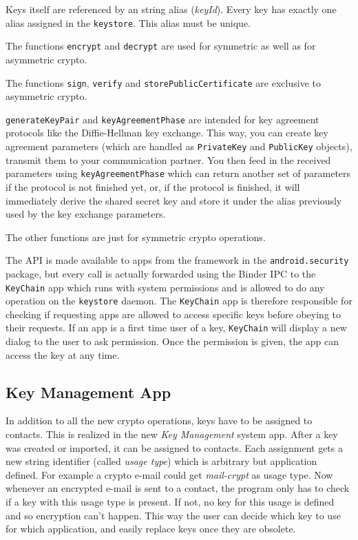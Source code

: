 \documentclass[a4paper,bibtotoc,draft]{scrartcl}
\begin{document}
		Keys itself are referenced by an string alias (\emph{keyId}). Every key has exactly one alias assigned in the \texttt{keystore}. This alias must be unique.
	
		The functions \texttt{encrypt} and \texttt{decrypt} are used for symmetric as well as for asymmetric crypto.

		The functions \texttt{sign}, \texttt{verify} and \texttt{storePublicCertificate} are exclusive to asymmetric crypto.

		\texttt{generateKeyPair} and \texttt{keyAgreementPhase} are intended for key agreement protocols like the Diffie-Hellman key exchange. This way, you can create key agreement parameters (which are handled as \texttt{PrivateKey} and \texttt{PublicKey} objects), transmit them to your communication partner. You then feed in the received parameters using \texttt{keyAgreementPhase} which can return another set of parameters if the protocol is not finished yet, or, if the protocol is finished, it will immediately derive the shared secret key and store it under the alias previously used by the key exchange parameters.

		The other functions are just for symmetric crypto operations.

		The API is made available to apps from the framework in the \texttt{android.security} package, but every call is actually forwarded using the Binder IPC to the \texttt{KeyChain} app which runs with system permissions and	is allowed to do any operation on the \texttt{keystore} daemon. The \texttt{KeyChain} app is therefore responsible	for checking if requesting apps are allowed to access specific keys before obeying to their requests. If an app is a first time user of a key, \texttt{KeyChain} will display a new dialog to the user to ask permission. Once the permission is given, the app can access the key at any time.
	
	\subsection{Key Management App}
		In addition to all the new crypto operations, keys have to be assigned to contacts. This is realized in the new {\em Key Management} system app. After a key was created or imported, it can be assigned to contacts. Each assignment gets a new string identifier (called {\em usage type}) which is arbitrary but application defined. For example a crypto e-mail could get \textit{mail-crypt} as usage type. Now whenever an encrypted e-mail is sent to a contact, the program only has to check if a key with this usage type is present. If not, no key for this usage is defined and so encryption can't happen. This way the user can decide which key to use for which application, and easily replace keys once they are obsolete.
		
\end{document}
